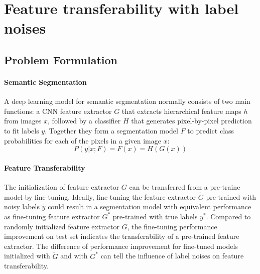 \section{Feature transferability with label noises}
\label{sec:robustness}


\subsection{Problem Formulation}
\label{subsec:formulation}

\paragraph{Semantic Segmentation}

A deep learning model for semantic segmentation normally consists of two main functions: a CNN feature extractor $G$ that extracts hierarchical feature maps $h$ from images $x$, followed by a classifier $H$ that generates pixel-by-pixel prediction to fit labels $y$.
Together they form a segmentation model $F$ to predict class probabilities for each of the pixels in a given image $x$:
$$P(y \vert x; F) = F(x) = H(G(x))$$

\paragraph{Feature Transferability}
The initialization of feature extractor $G$ can be transferred from a pre-traine model by fine-tuning.
Ideally, fine-tuning the feature extractor $\tilde{G}$ pre-trained with noisy labels $\tilde{y}$ could result in a segmentation model with equivalent performance as fine-tuning feature extractor $G^{\ast}$ pre-trained with true labels $y^{\ast}$.
Compared to randomly initialized feature extractor $G$, the fine-tuning performance improvement on test set indicates the transferability of a pre-trained feature extractor.
The difference of performance improvement for fine-tuned models initialized with $\tilde{G}$ and with $G^{\ast}$ can tell the influence of label noises on feature transferability.


